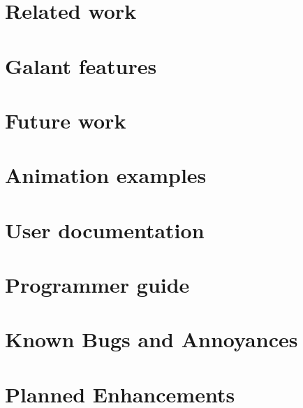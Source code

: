 \documentclass{article}
\begin{document}


\section{Related work}



\section{Galant features}\label{sec:galant_features}





\section{Future work}







\clearpage

\appendix

\section{Animation examples}
\label{sec:animations}


\clearpage

\section{User documentation}
\label{sec:user_documentation}


\clearpage

\section{Programmer guide}
\label{sec:programmer_guide}


\clearpage

\section{Known Bugs and Annoyances}
\label{sec:bugs}


\clearpage

\section{Planned Enhancements}
\label{sec:enhancements}


\end{document}
